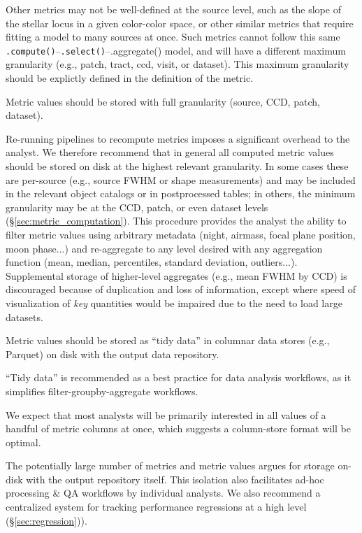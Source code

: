 Other metrics may not be well-defined at the source level, such as the slope of the stellar locus in a given color-color space, or other similar metrics that require fitting a model to many sources at once.  
Such metrics cannot follow this same \texttt{.compute()}--\texttt{.select()}--{.aggregate()} model, and will have a different maximum granularity (e.g., patch, tract, ccd, visit, or dataset).
This maximum granularity should be explictly defined in the definition of the metric.

\begin{recommendation} \label{sec:metric_storage}
Metric values should be stored with full granularity (source, CCD, patch, dataset).
\end{recommendation}

Re-running pipelines to recompute metrics imposes a significant overhead to the analyst.
We therefore recommend that in general all computed metric values should be stored on disk at the highest relevant granularity.
In some cases these are per-source (e.g., source FWHM or shape measurements) and may be included in the relevant object catalogs or in postprocessed tables; in others, the minimum granularity may be at the CCD, patch, or even dataset levels (\S \ref{sec:metric_computation}).
This procedure provides the analyst the ability to filter metric values using arbitrary metadata (night, airmass, focal plane position, moon phase...) and re-aggregate to any level desired with any aggregation function (mean, median, percentiles, standard deviation, outliers...).
Supplemental storage of higher-level aggregates (e.g., mean FWHM by CCD) is discouraged because of duplication and loss of information, except where speed of visualization of \emph{key} quantities would be impaired due to the need to load large datasets.


\begin{recommendation}
Metric values should be stored as ``tidy data'' in columnar data stores (e.g., Parquet) on disk with the output data repository.
\end{recommendation}

``Tidy data'' \citep{JSSv059i10} is recommended as a best practice for data analysis workflows, as it simplifies filter-groupby-aggregate workflows.

We expect that most analysts will be primarily interested in all values of a handful of metric columns at once, which suggests a column-store format will be optimal.

The potentially large number of metrics and metric values argues for storage on-disk with the output repository itself.
This isolation also facilitates ad-hoc processing \& QA workflows by individual analysts.
We also recommend a centralized system for tracking performance regressions at a high level (\S \ref{sec:regression})).

